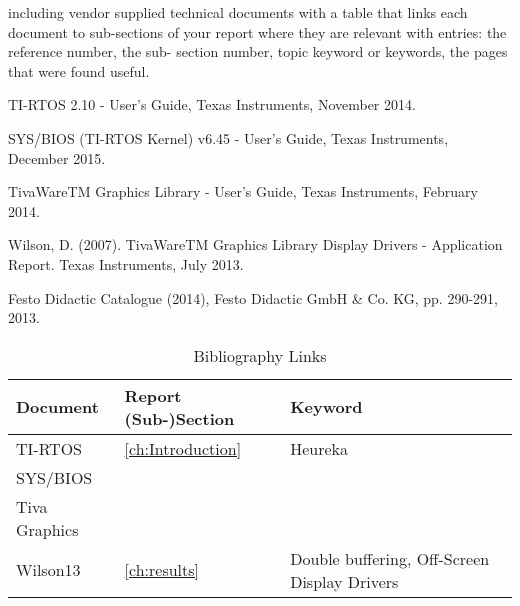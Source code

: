 \begin{thebibliography}{9}

 including vendor supplied technical documents with a table that links each document to sub-sections of your report where they are relevant with entries: the reference number, the sub- section number, topic keyword or keywords, the pages that were found useful.

TI-RTOS 2.10 - User's Guide, Texas Instruments, November 2014.

SYS/BIOS (TI-RTOS Kernel) v6.45 - User's Guide, Texas Instruments, December 2015.

TivaWareTM Graphics Library - User's Guide, Texas Instruments, February 2014.

Wilson, D. (2007). TivaWareTM Graphics Library Display Drivers - Application Report. Texas 
Instruments, July 2013.

Festo Didactic Catalogue (2014), Festo Didactic GmbH \& Co. KG, pp. 290-291, 2013.
 
\end{thebibliography}

\begin{table}[H]
	\begin{tabu} spread \linewidth {l | l | X[m]}
		\textbf{Document} & \textbf{Report (Sub-)Section} & \textbf{Keyword} \\
		\hline
		\hline
		TI-RTOS & \ref{ch:Introduction} & Heureka\\
		\hline
		SYS/BIOS & & \\
		\hline
		Tiva Graphics & & \\
		\hline
		Wilson13 & \ref{ch:results} & Double buffering, Off-Screen Display Drivers\\	
	\end{tabu}
	\caption{Bibliography Links}
	\label{tab:BibliographyLinks}
\end{table}

\vfill
